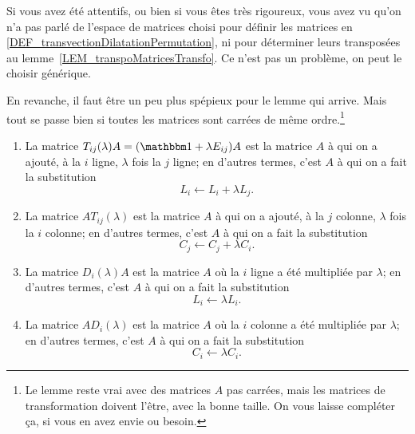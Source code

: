 Si vous avez été attentifs, ou bien si vous êtes très rigoureux, vous avez vu qu'on n'a pas parlé de l'espace de matrices choisi pour définir les matrices en \ref{DEF_transvectionDilatationPermutation}, ni pour déterminer leurs transposées au lemme~\ref{LEM_transpoMatricesTransfo}. Ce n'est pas un problème, on peut le choisir générique.

En revanche, il faut être un peu plus spépieux pour le lemme qui arrive. Mais tout se passe bien si toutes les matrices sont carrées de même ordre.\footnote{Le lemme reste vrai avec des matrices \( A \) pas carrées, mais les matrices de transformation doivent l'être, avec la bonne taille. On vous laisse compléter ça, si vous en avez envie ou besoin.}
\begin{lemma}   \label{LemyrAXQs}
\begin{enumerate}
  \item \label{LemyrAXQsooi}
    La matrice \( T_{ij}(\lambda)A=(\mtu+\lambda E_{ij})A\) est la matrice \( A\) à qui on a ajouté, à la \( i \)\ieme{} ligne, \( \lambda \) fois la \( j \) \ieme{} ligne; en d'autres termes, c'est \(A \) à qui on a fait la substitution
    \begin{equation}
        L_i\leftarrow L_i+\lambda L_j.
    \end{equation}
    
  \item  \label{LemyrAXQsooii}
    La matrice \( AT_{ij}(\lambda)\)  est la matrice \( A\) à qui on a ajouté, à la \( j \)\ieme{} colonne, \( \lambda \) fois la \( i \) \ieme{} colonne; en d'autres termes, c'est \(A \) à qui on a fait la substitution
    \begin{equation}
        C_j\leftarrow C_j+\lambda C_i.
    \end{equation}

  \item  \label{LemyrAXQsooiii}
    La matrice \( D_{i}(\lambda)A\) est la matrice \( A\) où la \( i\)\ieme{} ligne a été multipliée par \( \lambda \); en d'autres termes, c'est \( A \) à qui on a fait la substitution
    \begin{equation}
        L_i\leftarrow \lambda L_i.
    \end{equation}

  \item  \label{LemyrAXQsooiv}
    La matrice \( AD_{i}(\lambda)\) est la matrice \( A\) où la \( i\)\ieme{} colonne a été multipliée par \( \lambda \); en d'autres termes, c'est \( A \) à qui on a fait la substitution
    \begin{equation}
        C_i\leftarrow \lambda C_i.
    \end{equation}
    

\end{enumerate}
\end{lemma}
